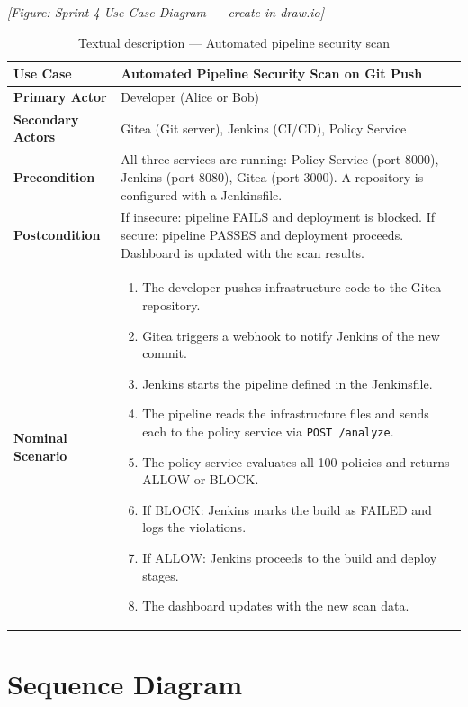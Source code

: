 \textit{[Figure: Sprint 4 Use Case Diagram — create in draw.io]}

\vspace{0.3cm}

\begin{table}[H]
\centering
\caption{Textual description — Automated pipeline security scan}
\label{tab:sprint4-usecase-text}
\begin{tabular}{|p{3.5cm}|p{9.5cm}|}
\hline
\textbf{Use Case} & Automated Pipeline Security Scan on Git Push \\
\hline
\textbf{Primary Actor} & Developer (Alice or Bob) \\
\hline
\textbf{Secondary Actors} & Gitea (Git server), Jenkins (CI/CD), Policy Service \\
\hline
\textbf{Precondition} & All three services are running: Policy Service (port 8000), Jenkins (port 8080), Gitea (port 3000). A repository is configured with a Jenkinsfile. \\
\hline
\textbf{Postcondition} & If insecure: pipeline FAILS and deployment is blocked. If secure: pipeline PASSES and deployment proceeds. Dashboard is updated with the scan results. \\
\hline
\textbf{Nominal Scenario} &
\begin{enumerate}[nosep]
    \item The developer pushes infrastructure code to the Gitea repository.
    \item Gitea triggers a webhook to notify Jenkins of the new commit.
    \item Jenkins starts the pipeline defined in the Jenkinsfile.
    \item The pipeline reads the infrastructure files and sends each to the policy service via \texttt{POST /analyze}.
    \item The policy service evaluates all 100 policies and returns ALLOW or BLOCK.
    \item If BLOCK: Jenkins marks the build as FAILED and logs the violations.
    \item If ALLOW: Jenkins proceeds to the build and deploy stages.
    \item The dashboard updates with the new scan data.
\end{enumerate} \\
\hline
\end{tabular}
\end{table}

\section{Sequence Diagram}

